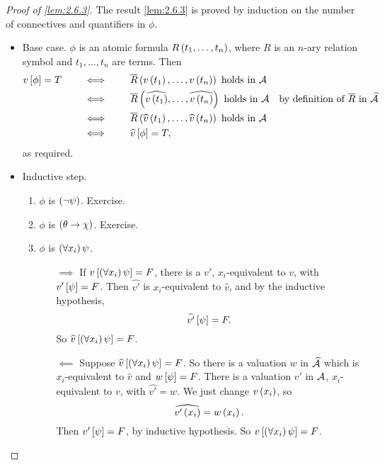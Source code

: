 \begin{proof}[Proof of \ref{lem:2.6.3}]
The result \ref{lem:2.6.3} is proved by induction on the number of connectives and quantifiers in $ \phi $.
\begin{itemize}
\item Base case. $ \phi $ is an atomic formula $ R\rb{t_1, \dots, t_n} $, where $ R $ is an $ n $-ary relation symbol and $ t_1, \dots, t_n $ are terms. Then
\begin{align*}
v\sb{\phi} = T \qquad
& \iff \qquad \overline{R}\rb{v\rb{t_1}, \dots, v\rb{t_n}} \ \text{holds in} \ \AA \\
& \iff \qquad \overline{R}\rb{\widehat{v\rb{t_1}}, \dots, \widehat{v\rb{t_n}}} \ \text{holds in} \ \AA & \text{by definition of} \ \overline{R} \ \text{in} \ \widehat{\AA} \\
& \iff \qquad \overline{R}\rb{\widehat{v}\rb{t_1}, \dots, \widehat{v}\rb{t_n}} \ \text{holds in} \ \AA \\
& \iff \qquad \widehat{v}\sb{\phi} = T,
\end{align*}
as required.
\item Inductive step.
\begin{enumerate}[leftmargin=0.5in, label=Case \arabic*.]
\item $ \phi $ is $ \notb{\psi} $. Exercise.
\item $ \phi $ is $ \impb{\theta}{\chi} $. Exercise.
\item $ \phi $ is $ \fab{x_i}\psi $.
\begin{itemize}
\item[$ \implies $] If $ v\sb{\fab{x_i}\psi} = F $, there is a $ v' $, $ x_i $-equivalent to $ v $, with $ v'\sb{\psi} = F $. Then $ \widehat{v'} $ is $ x_i $-equivalent to $ \widehat{v} $, and by the inductive hypothesis,
$$ \widehat{v'}\sb{\psi} = F. $$
So $ \widehat{v}\sb{\fab{x_i}\psi} = F $.
\item[$ \impliedby $] Suppose $ \widehat{v}\sb{\fab{x_i}\psi} = F $. So there is a valuation $ w $ in $ \widehat{\AA} $ which is $ x_i $-equivalent to $ \widehat{v} $ and $ w\sb{\psi} = F $. There is a valuation $ v' $ in $ \AA $, $ x_i $-equivalent to $ v $, with $ \widehat{v'} = w $. We just change $ v\rb{x_i} $, so
$$ \widehat{v'\rb{x_i}} = w\rb{x_i}. $$
Then $ v'\sb{\psi} = F $, by inductive hypothesis. So $ v\sb{\fab{x_i}\psi} = F $.
\end{itemize}
\end{enumerate}
\end{itemize}
\end{proof}

